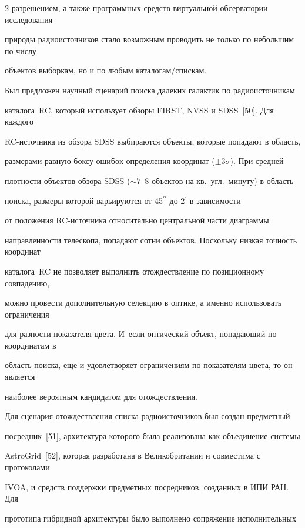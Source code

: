 \begin{multicols}{2}
разрешением, а также программных средств виртуальной обсерватории исследования 

природы радиоисточников стало возможным проводить не только по небольшим по числу 

объектов выборкам, но и по любым каталогам/спискам. 

      

      Был предложен научный сценарий поиска далеких галактик по радиоисточникам 

каталога~RC, который использует обзоры FIRST, NVSS и SDSS~[50]. Для каждого 

RC-ис\-точ\-ни\-ка из обзора SDSS выбираются объекты, которые попадают в область, 

размерами равную боксу ошибок определения координат ($\pm 3\sigma$). При средней 

плотности объектов обзора SDSS ($\sim7$--8 объектов на кв.\ угл.\ минуту) в область 

поиска, размеры которой варьируются от 45$^{\prime\prime}$ до 2$^\prime$ в зависимости 

от положения RC-ис\-точ\-ни\-ка относительно центральной части диаграммы 

направленности телескопа, попадают сотни объектов. Поскольку низкая точность координат 

каталога~RC не позволяет выполнить отождествление по позиционному совпадению, 

можно провести дополнительную селекцию в оптике, а именно использовать ограничения 

для разности показателя цвета. И~если оптический объект, попадающий по координатам в 

область поиска, еще и удовлетворяет ограничениям по показателям цвета, то он является 

наиболее вероятным кандидатом для отождествления. 



Для сценария отождествления списка радиоисточников был создан предметный 

посредник~[51], архитектура которого была реализована как объединение системы 

AstroGrid~[52], которая разработана в Великобритании и совместима с протоколами 

IVOA, и средств поддержки предметных посредников, созданных в ИПИ РАН. Для 

прототипа гиб\-рид\-ной архитектуры было выполнено сопряжение исполнительных 


\end{multicols}
